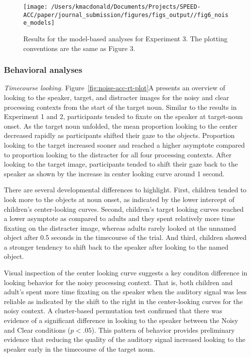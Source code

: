 \documentclass[english,floatsintext,man]{apa6}
\begin{document}
\begin{figure}[!t]

{\centering \texttt{[image: /Users/kmacdonald/Documents/Projects/SPEED-ACC/paper/journal\_submission/figures/figs\_output//fig6\_noise\_models]} 

}

\caption{Results for the model-based analyses for Experiment 3. The plotting conventions are the same as Figure 3.}\label{fig:noise-model-plots}
\end{figure}

\hypertarget{behavioral-analyses-1}{%
\subsubsection{Behavioral analyses}\label{behavioral-analyses-1}}

\emph{Timecourse looking.} Figure~\ref{fig:noise-acc-rt-plot}A presents
an overview of looking to the speaker, target, and distracter images for
the noisy and clear processing contexts from the start of the target
noun. Similar to the results in Experiment 1 and 2, participants tended
to fixate on the speaker at target-noun onset. As the target noun
unfolded, the mean proportion looking to the center decreased rapidly as
participants shifted their gaze to the objects. Proportion looking to
the target increased sooner and reached a higher asymptote compared to
proportion looking to the distracter for all four processing contexts.
After looking to the target image, participants tended to shift their
gaze back to the speaker as shown by the increase in center looking
curve around 1 second.

There are several developmental differences to highlight. First,
children tended to look more to the objects at noun onset, as indicated
by the lower intercept of children's center-looking curves. Second,
children's target looking curves reached a lower asymptote as compared
to adults and they spent relatively more time fixating on the distracter
image, whereas adults rarely looked at the unnamed object after 0.5
seconds in the timecourse of the trial. And third, children showed a
stronger tendency to shift back to the speaker after looking to the
named object.

Visual inspection of the center looking curve suggests a key conditon
difference in looking behavior for the noisy processing context. That
is, both children and adult's spent more time fixating on the speaker
when the auditory signal was less reliable as indicated by the shift to
the right in the center-looking curves for the noisy context. A
cluster-based permutation test confirmed that there was evidence of a
significant difference in looking to the speaker between the Noisy and
Clear conditions (\(p < .05\)). This pattern of behavior provides
preliminary evidence that reducing the quality of the auditory signal
increased looking to the speaker early in the timecourse of the target
noun.
\end{document}
